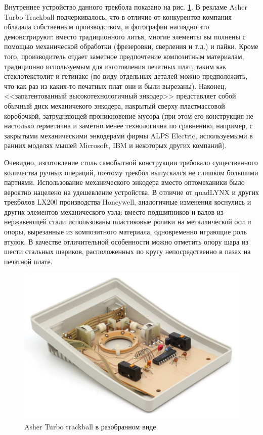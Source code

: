 \documentclass[11pt, a4paper]{article}
\begin{document}
Внутреннее устройство данного трекбола показано на рис. \ref{fig:AsherInside}. В рекламе Asher Turbo Trackball подчеркивалось, что в отличие от конкурентов компания обладала собственным производством, и фотографии наглядно это демонстрируют: вместо традиционного литья, многие элементы вы полнены с помощью механической обработки (фрезеровки, сверления и т.д.) и пайки. Кроме того,  производитель отдает заметное предпочтение композитным материалам, традиционно используемым для изготовления печатных плат, таким как стеклотекстолит и гетинакс (по виду отдельных деталей можно предположить, что как раз из каких-то печатных плат они и были вырезаны). Наконец, <<запатентованный высокотехнологичный энкодер>> \cite{turbo} представляет собой обычный диск механичекого энкодера, накрытый сверху пластмассовой коробочкой, затрудняющей проникновение мусора (при этом его конструкция не настолько герметична и заметно менее технологична по сравнению, например, с закрытыми механическими энкодерами фирмы ALPS Electric, используемыми в ранних моделях мышей Microsoft, IBM и некоторых других компаний).

Очевидно, изготовление столь самобытной конструкции требовало существенного количества ручных операций, поэтому трекбол выпускался не слишком большими партиями.
Использование механического энкодера вместо оптомеханики было вероятно нацелено на удешевление устройства. В отличие от quadLYNX и других трекболов LX200 производства Honeywell, аналогичные изменения коснулись и других элементов механического узла: вместо подшипников и валов из нержавеющей стали использованы пластиковые ролики на металлической оси и опоры, вырезанные из композитного материала, одновременно играющие роль втулок. В качестве отличительной особенности можно отметить опору шара из шести стальных шариков, расположенных по кругу непосредственно в пазах на печатной плате.

\begin{figure}[h]
    \centering
    \includegraphics[scale=0.7]{1988_asher_turbo_trackball/inside_60.jpg}
    \caption{Asher Turbo trackball в разобранном виде}
    \label{fig:AsherInside}
\end{figure}
\end{document}
